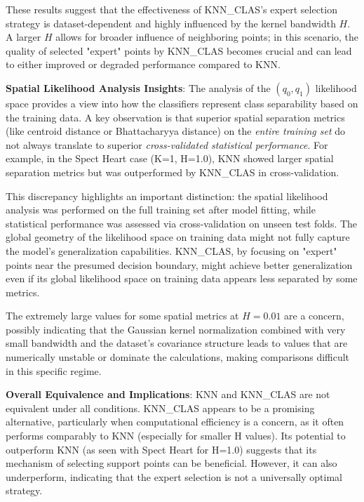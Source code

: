 \documentclass[conference]{IEEEtran}
\begin{document}
These results suggest that the effectiveness of KNN\_CLAS's expert selection strategy is dataset-dependent and highly influenced by the kernel bandwidth $H$. A larger $H$ allows for broader influence of neighboring points; in this scenario, the quality of selected "expert" points by KNN\_CLAS becomes crucial and can lead to either improved or degraded performance compared to KNN.

\textbf{Spatial Likelihood Analysis Insights}:
The analysis of the $(q_0, q_1)$ likelihood space provides a view into how the classifiers represent class separability based on the training data. A key observation is that superior spatial separation metrics (like centroid distance or Bhattacharyya distance) on the \textit{entire training set} do not always translate to superior \textit{cross-validated statistical performance}. For example, in the Spect Heart case (K=1, H=1.0), KNN showed larger spatial separation metrics but was outperformed by KNN\_CLAS in cross-validation.

This discrepancy highlights an important distinction: the spatial likelihood analysis was performed on the full training set after model fitting, while statistical performance was assessed via cross-validation on unseen test folds. The global geometry of the likelihood space on training data might not fully capture the model's generalization capabilities. KNN\_CLAS, by focusing on "expert" points near the presumed decision boundary, might achieve better generalization even if its global likelihood space on training data appears less separated by some metrics.

The extremely large values for some spatial metrics at $H=0.01$ are a concern, possibly indicating that the Gaussian kernel normalization combined with very small bandwidth and the dataset's covariance structure leads to values that are numerically unstable or dominate the calculations, making comparisons difficult in this specific regime.

\textbf{Overall Equivalence and Implications}:
KNN and KNN\_CLAS are not equivalent under all conditions. KNN\_CLAS appears to be a promising alternative, particularly when computational efficiency is a concern, as it often performs comparably to KNN (especially for smaller H values). Its potential to outperform KNN (as seen with Spect Heart for H=1.0) suggests that its mechanism of selecting support points can be beneficial. However, it can also underperform, indicating that the expert selection is not a universally optimal strategy.
\end{document}
